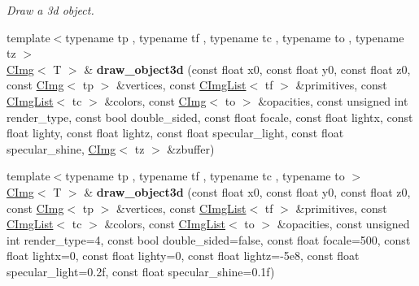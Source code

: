 \begin{DoxyCompactItemize}
\begin{DoxyCompactList}\small\item\em Draw a 3d object. \item\end{DoxyCompactList}\item 
\hypertarget{structcimg__library_1_1CImg_a9375cc44f81be3d84a5bca44294c7502}{
{\footnotesize template$<$typename tp , typename tf , typename tc , typename to , typename tz $>$ }\\\hyperlink{structcimg__library_1_1CImg}{CImg}$<$ T $>$ \& {\bfseries draw\_\-object3d} (const float x0, const float y0, const float z0, const \hyperlink{structcimg__library_1_1CImg}{CImg}$<$ tp $>$ \&vertices, const \hyperlink{structcimg__library_1_1CImgList}{CImgList}$<$ tf $>$ \&primitives, const \hyperlink{structcimg__library_1_1CImgList}{CImgList}$<$ tc $>$ \&colors, const \hyperlink{structcimg__library_1_1CImg}{CImg}$<$ to $>$ \&opacities, const unsigned int render\_\-type, const bool double\_\-sided, const float focale, const float lightx, const float lighty, const float lightz, const float specular\_\-light, const float specular\_\-shine, \hyperlink{structcimg__library_1_1CImg}{CImg}$<$ tz $>$ \&zbuffer)}
\label{structcimg__library_1_1CImg_a9375cc44f81be3d84a5bca44294c7502}

\item 
\hypertarget{structcimg__library_1_1CImg_acf2f6a58fd60b11cdc3a11f7663f098a}{
{\footnotesize template$<$typename tp , typename tf , typename tc , typename to $>$ }\\\hyperlink{structcimg__library_1_1CImg}{CImg}$<$ T $>$ \& {\bfseries draw\_\-object3d} (const float x0, const float y0, const float z0, const \hyperlink{structcimg__library_1_1CImg}{CImg}$<$ tp $>$ \&vertices, const \hyperlink{structcimg__library_1_1CImgList}{CImgList}$<$ tf $>$ \&primitives, const \hyperlink{structcimg__library_1_1CImgList}{CImgList}$<$ tc $>$ \&colors, const \hyperlink{structcimg__library_1_1CImgList}{CImgList}$<$ to $>$ \&opacities, const unsigned int render\_\-type=4, const bool double\_\-sided=false, const float focale=500, const float lightx=0, const float lighty=0, const float lightz=-\/5e8, const float specular\_\-light=0.2f, const float specular\_\-shine=0.1f)}
\label{structcimg__library_1_1CImg_acf2f6a58fd60b11cdc3a11f7663f098a}


\end{DoxyCompactItemize}
